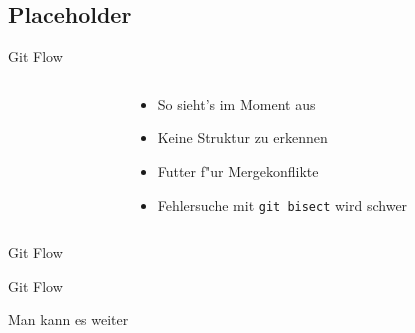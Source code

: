 \documentclass{beamer}
\begin{document}
\subsection{Placeholder}
\begin{frame}{Git Flow}
	\begin{columns}[T] %
		\begin{column}{.33\textwidth}
			\resizebox{!}{.8\textheight}{
					
			}
		\end{column}
		\hfill
		\begin{column}{.67\textwidth}
			\vfill
			\begin{itemize}[<+->]
				\item So sieht's im Moment aus
				\item Keine Struktur zu erkennen
				\item Futter f"ur Mergekonflikte
				\item Fehlersuche mit \texttt{git bisect} wird schwer
			\end{itemize}
		\end{column}
	\end{columns}
\end{frame}

\begin{frame}{Git Flow}
	\begin{center}
		\resizebox{!}{.8\textheight}{
			
		}
	\end{center}
\end{frame}

\begin{frame}{Git Flow}
	\begin{center}
		Man kann es weiter 
		\resizebox{!}{.8\textheight}{
			
		}
	\end{center}
\end{frame}
\end{document}

